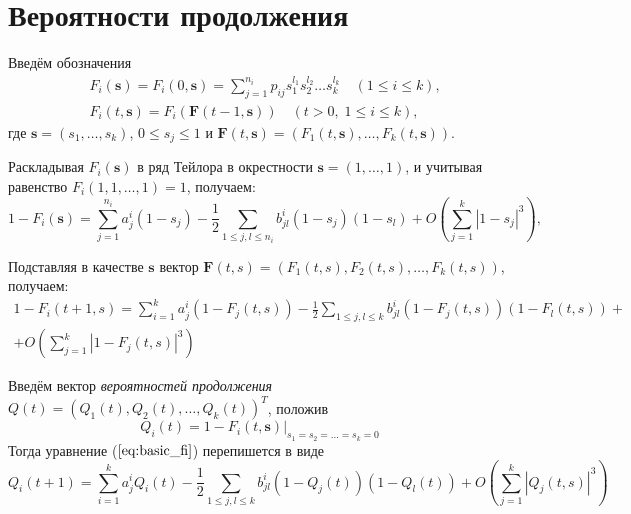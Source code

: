 \documentclass[12pt]{article}
\renewcommand{\leq}{\leqslant}
\begin{document}
\section{Вероятности продолжения}

Введём обозначения
\begin{equation}
\begin{split}
	&F_i(\mathbf{s}) = F_i(0, \mathbf{s}) = \sum_{j = 1}^{n_i} p_{ij} s_1^{l_1} s_2^{l_2} \ldots s_k^{l_k}\quad (1 \leq i \leq k), \\
	&F_i(t, \mathbf{s}) = F_i(\mathbf{F}(t-1, \mathbf{s}))\quad (t > 0,\; 1 \leq i \leq k),
\end{split}
\end{equation}
где $\mathbf{s} = (s_1, \ldots, s_k)$, $0 \leq s_j \leq 1$ и $\mathbf{F}(t, \mathbf{s}) = (F_1(t, \mathbf{s}), \ldots, F_k(t, \mathbf{s}))$.

Раскладывая $F_i(\mathbf{s})$ в ряд Тейлора в окрестности $\mathbf{s} = (1, \ldots, 1)$, и учитывая равенство $F_i(1, 1, \ldots, 1) = 1$, получаем:
\begin{equation}
	1 - F_i(\mathbf{s}) = \sum_{j = 1}^{n_i} a^i_j(1 - s_j) - \frac{1}{2} \sum_{1 \leq j,l \leq n_i} b^i_{jl} (1 - s_j) (1 - s_l) + O\left(\sum_{j = 1}^k \left| 1 - s_j \right|^3\right),
\end{equation}

Подставляя в качестве $\textbf{s}$ вектор $\textbf{F}(t, s) = (F_1(t, s), F_2(t, s), \ldots, F_k(t, s))$, получаем:
\begin{multline}
\label{eq:basic_fi}
	1 - F_i(t + 1, s) = \sum_{i = 1}^k a^i_j (1 - F_j(t,s)) - \frac{1}{2} \sum_{1 \leq j,l \leq k} b^i_{jl} (1 - F_j(t,s)) (1 - F_l(t,s)) + \\
	+ O\left( \sum_{j = 1}^k \left| 1 - F_j(t,s) \right|^3 \right)
\end{multline}

Введём вектор \textit{вероятностей продолжения} $Q(t) = (Q_1(t), Q_2(t), \ldots, Q_k(t))^T$, положив
\begin{equation}
	Q_i(t) = 1 - \left. F_i(t, \textbf{s}) \right|_{s_1 = s_2 = \ldots = s_k = 0}
\end{equation}
Тогда уравнение ($\ref{eq:basic_fi}$) перепишется в виде
\begin{equation}
\label{eq:basic_qi}
	Q_i(t+1) = \sum_{i = 1}^k a^i_j Q_i(t) - \frac{1}{2} \sum_{1 \leq j,l \leq k} b^i_{jl} (1 - Q_j(t)) (1 - Q_l(t)) + O \left( \sum_{j = 1}^k \left| Q_j(t,s) \right|^3 \right)
\end{equation}
\end{document}
